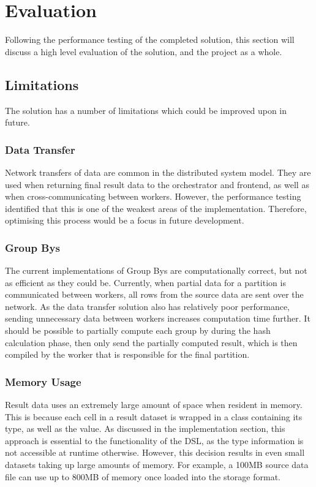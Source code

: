 \chapter{Evaluation}\label{cha:evaluation}
Following the performance testing of the completed solution, this section will discuss a high level evaluation of the solution, and the project as a whole.

\section{Limitations}
The solution has a number of limitations which could be improved upon in future.

\subsection{Data Transfer}
Network transfers of data are common in the distributed system model. They are used when returning final result data to the orchestrator and frontend, as well as when cross-communicating between workers. However, the performance testing identified that this is one of the weakest areas of the implementation. Therefore, optimising this process would be a focus in future development.

\subsection{Group Bys}
The current implementations of Group Bys are computationally correct, but not as efficient as they could be. Currently, when partial data for a partition is communicated between workers, all rows from the source data are sent over the network. As the data transfer solution also has relatively poor performance, sending unnecessary data between workers increases computation time further. It should be possible to partially compute each group by during the hash calculation phase, then only send the partially computed result, which is then compiled by the worker that is responsible for the final partition. 

\subsection{Memory Usage}
Result data uses an extremely large amount of space when resident in memory. This is because each cell in a result dataset is wrapped in a class containing its type, as well as the value. As discussed in the implementation section, this approach is essential to the functionality of the DSL, as the type information is not accessible at runtime otherwise. However, this decision results in even small datasets taking up large amounts of memory. For example, a 100MB source data file can use up to 800MB of memory once loaded into the storage format.

